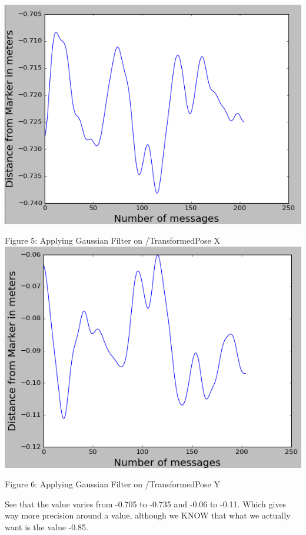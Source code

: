 \documentclass{article}
\begin{document}
\begin{center}
    \includegraphics[scale=0.5]{pictures/pic10.png}
    
    Figure 5: Applying Gaussian Filter on /TransformedPose X
    \includegraphics[scale=0.5]{pictures/pic11.png}
    
    Figure 6: Applying Gaussian Filter on /TransformedPose Y
\end{center}

See that the value varies from -0.705 to -0.735 and -0.06 to -0.11. Which gives way more precision around a value, although we KNOW that what we actually want is the value -0.85.
\end{document}
